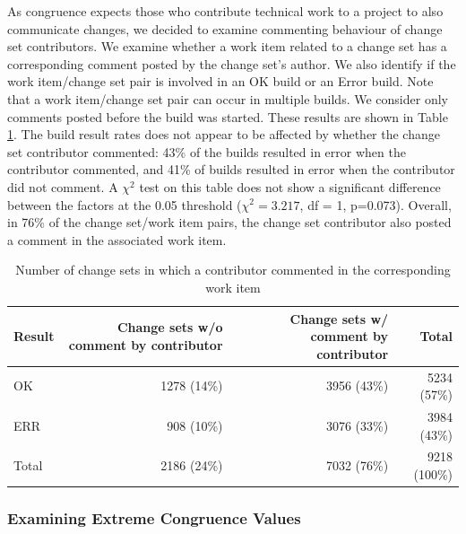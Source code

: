 As congruence expects those who contribute technical work to a project to also communicate changes, we decided to examine commenting behaviour of change set contributors.
We examine whether a work item related to a change set has a corresponding comment posted by the change set's author. We also identify if the work item/change set pair is involved in an OK build or an Error build. Note that a work item/change set pair can occur in multiple builds. We consider only comments posted before the build was started. These results are shown in Table \ref{tab:changesets_authors}.
The build result rates does not appear to be affected by whether the change set contributor commented: 43\% of the builds resulted in error when the contributor commented, and 41\% of builds resulted in error when the contributor did not comment. A $\chi^2$ test on this table does not show a significant difference between the factors at the 0.05 threshold ($\chi^2 = 3.217$, df = 1, {p=0.073}).
Overall, in 76\% of the change set/work item pairs, the change set contributor also posted a comment in the associated work item.
\begin{table}[t]
\centering
\begin{tabular}{lrrr}
Result & \parbox{0.715in}{\raggedright Change sets w/o comment by contributor\vspace{1pt}} & \parbox{0.715in}{\raggedright Change sets w/ comment by contributor\vspace{1pt}} & Total \\\hline 
OK		& 1278 (14\%) 	& 3956 (43\%) 	& 5234 (57\%) 	\\
ERR		& 908 (10\%) 	& 3076 (33\%)	& 3984 (43\%)	\\\hline
Total 	& 2186 (24\%) 	& 7032 (76\%) 	& 9218 (100\%)	\\
\end{tabular}
\caption{Number of change sets in which a contributor commented in the corresponding work item}
\label{tab:changesets_authors}
\end{table}


\subsubsection{Examining Extreme Congruence Values}
\label{sec:extremecongruence}

